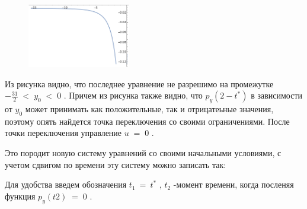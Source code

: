 \documentclass[a4paper,12pt]{article}
\begin{document}
\begin{figure}
    \includegraphics[width=0.4\textwidth]{img1.png}
\end{figure}

Из рисунка видно, что последнее уравнение не разрешимо на промежутке $-\frac{31}{2}\;<\;y_0\;<\;0$ .
Причем из рисунка также видно, что $p_y(2-t^*)$ в зависимости от $y_0$ может принимать как положительные, так и отрицатеьные значения, поэтому опять найдется точка переключения со своими ограничениями. После точки переключения управление $u\;=\;0$ .

Это породит новую систему уравнений со своими начальными условиями, с учетом сдвигом по времени эту систему можно записать так:

Для удобства введем обозначения $t_1\:=\: t^*$ , $t_2$ -момент времени, когда посленяя функция $p_y(t2)\;=\;0$ . 
\end{document}

